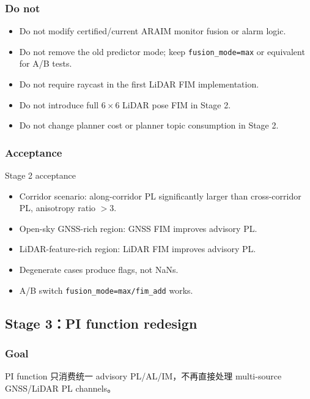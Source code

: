 \documentclass[11pt,a4paper]{article}
\begin{document}
\subsubsection{Do not}
\begin{itemize}
\item Do not modify certified/current ARAIM monitor fusion or alarm logic.
\item Do not remove the old predictor mode; keep \texttt{fusion\_mode=max} or equivalent for A/B tests.
\item Do not require raycast in the first LiDAR FIM implementation.
\item Do not introduce full $6\times6$ LiDAR pose FIM in Stage 2.
\item Do not change planner cost or planner topic consumption in Stage 2.
\end{itemize}

\subsubsection{Acceptance}
\begin{acceptbox}{Stage 2 acceptance}
\begin{itemize}
  \item Corridor scenario: along-corridor PL significantly larger than cross-corridor PL, anisotropy ratio $>3$.
  \item Open-sky GNSS-rich region: GNSS FIM improves advisory PL.
  \item LiDAR-feature-rich region: LiDAR FIM improves advisory PL.
  \item Degenerate cases produce flags, not NaNs.
  \item A/B switch \texttt{fusion\_mode=max/fim\_add} works.
\end{itemize}
\end{acceptbox}

\subsection{Stage 3：PI function redesign}

\subsubsection{Goal}
PI function 只消费统一 advisory PL/AL/IM，不再直接处理 multi-source GNSS/LiDAR PL channels。
\end{document}
